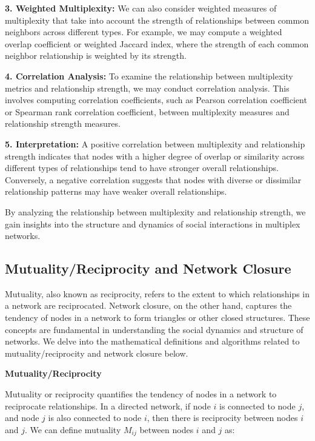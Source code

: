 \documentclass[12pt]{book} %
\begin{document}
\textbf{3. Weighted Multiplexity:} We can also consider weighted measures of multiplexity that take into account the strength of relationships between common neighbors across different types. For example, we may compute a weighted overlap coefficient or weighted Jaccard index, where the strength of each common neighbor relationship is weighted by its strength.

\textbf{4. Correlation Analysis:} To examine the relationship between multiplexity metrics and relationship strength, we may conduct correlation analysis. This involves computing correlation coefficients, such as Pearson correlation coefficient or Spearman rank correlation coefficient, between multiplexity measures and relationship strength measures.

\textbf{5. Interpretation:} A positive correlation between multiplexity and relationship strength indicates that nodes with a higher degree of overlap or similarity across different types of relationships tend to have stronger overall relationships. Conversely, a negative correlation suggests that nodes with diverse or dissimilar relationship patterns may have weaker overall relationships.

By analyzing the relationship between multiplexity and relationship strength, we gain insights into the structure and dynamics of social interactions in multiplex networks.

\subsection{Mutuality/Reciprocity and Network Closure}

Mutuality, also known as reciprocity, refers to the extent to which relationships in a network are reciprocated. Network closure, on the other hand, captures the tendency of nodes in a network to form triangles or other closed structures. These concepts are fundamental in understanding the social dynamics and structure of networks. We delve into the mathematical definitions and algorithms related to mutuality/reciprocity and network closure below.

\textbf{Mutuality/Reciprocity}

Mutuality or reciprocity quantifies the tendency of nodes in a network to reciprocate relationships. In a directed network, if node \(i\) is connected to node \(j\), and node \(j\) is also connected to node \(i\), then there is reciprocity between nodes \(i\) and \(j\). We can define mutuality \(M_{ij}\) between nodes \(i\) and \(j\) as:
\end{document}
